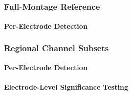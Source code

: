 




\subsubsection{Full-Montage Reference}
\label{sec:exp1_reference}

\paragraph{Per-Electrode Detection}
\label{sec:exp1_per_electrode}










\subsubsection{Regional Channel Subsets}
\label{sec:exp1_regional}

\paragraph{Per-Electrode Detection}
\label{sec:exp1_regional_per_electrode}





\paragraph{Electrode-Level Significance Testing}
\label{sec:exp1_regional_electrode_level_stats}








